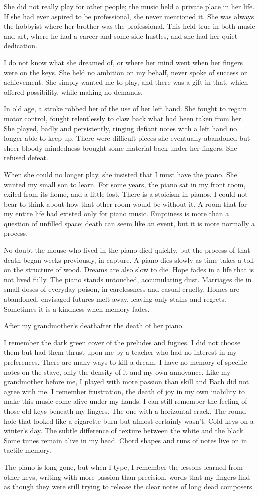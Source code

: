 She did not really play for other people; the music held a private
place in her life. If she had ever aspired to be professional, she
never mentioned it. She was always the hobbyist where her brother was
the professional. This held true in both music and art, where he had a
career and some side hustles, and she had her quiet dedication.

I do not know what she dreamed of, or where her mind went when her
fingers were on the keys. She held no ambition on my behalf, never
spoke of success or achievement. She simply wanted me to play, and
there was a gift in that, which offered possibility, while making no
demands.

In old age, a stroke robbed her of the use of her left hand. She
fought to regain motor control, fought relentlessly to claw back what
had been taken from her. She played, badly and persistently, ringing
defiant notes with a left hand no longer able to keep up. There were
difficult pieces she eventually abandoned but sheer bloody-mindedness
brought some material back under her fingers. She refused defeat.

When she could no longer play, she insisted that I must have the
piano. She wanted my small son to learn. For some years, the piano sat
in my front room, exiled from its home, and a little lost. There is a
stoicism in pianos. I could not bear to think about how that other
room would be without it. A room that for my entire life had existed
only for piano music. Emptiness is more than a question of unfilled
space; death can seem like an event, but it is more normally a
process.

No doubt the mouse who lived in the piano died quickly, but the
process of that death began weeks previously, in capture. A piano dies
slowly as time takes a toll on the structure of wood. Dreams are also
slow to die. Hope fades in a life that is not lived fully. The piano
stands untouched, accumulating dust. Marriages die in small doses of
everyday poison, in carelessness and casual cruelty. Homes are
abandoned, envisaged futures melt away, leaving only stains and
regrets. Sometimes it is a kindness when memory fades.

After my grandmother's death\=after the death of her piano.

I remember the dark green cover of the preludes and fugues. I did not
choose them but had them thrust upon me by a teacher who had no
interest in my preferences. There are many ways to kill a dream. I
have no memory of specific notes on the stave, only the density of it
and my own annoyance. Like my grandmother before me, I played with
more passion than skill and Bach did not agree with me. I remember
frustration, the death of joy in my own inability to make this music
come alive under my hands. I can still remember the feeling of those
old keys beneath my fingers. The one with a horizontal crack. The
round hole that looked like a cigarette burn but almost certainly
wasn't. Cold keys on a winter's day. The subtle difference of texture
between the white and the black. Some tunes remain alive in my
head. Chord shapes and runs of notes live on in tactile memory.

The piano is long gone, but when I type, I remember the lessons
learned from other keys, writing with more passion than precision,
words that my fingers find as though they were still trying to release
the clear notes of long dead composers.
